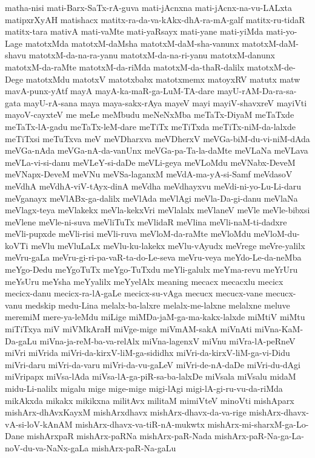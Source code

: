 {matha-nisi
mati-Barx-SaTx-rA-guva
mati-jAcnxna
mati-jAcnx-na-vu-LALxta
matipxrXyAH
matishacx
matitx-ra-da-va-kAkx-dhA-ra-mA-galf
matitx-ru-tidaR
matitx-tara
mativA
mati-vaMte
mati-yaRsayx
mati-yane
mati-yiMda
mati-yo-Lage
matotxMda
matotxM-daMsha
matotxM-daM-sha-vanunx
matotxM-daM-shavu
matotxM-da-na-ra-yanu
matotxM-da-na-ri-yanu
matotxM-danunx
matotxM-da-raMte
matotxM-da-riMda
matotxM-da-thaR-dalilx
matotxM-de-Dege
matotxMdu
matotxV
matotxbabx
matotxmemx
matoyxRV
matutx
matw
mavA-punx-yAtf
mayA
mayA-ka-maR-ga-LuM-TA-dare
mayU-rAM-Da-ra-sa-gata
mayU-rA-sana
maya
maya-sakx-rAya
mayeV
mayi
mayiV-shavxreV
mayiVti
mayoV-cayxteV
me
meLe
meMbudu
meNeNxMba
meTaTx-DiyaM
meTaTxde
meTaTx-lA-gadu
meTaTx-leM-dare
meTiTx
meTiTxda
meTiTx-niM-da-lalxde
meTiTxsi
meTuTxva
meV
meVDharxva
meVDherxV
meVGa-biM-du-vi-niM-dAda
meVGa-nAda
meVGa-nA-da-vanUnx
meVGa-pa-Ta-la-daMte
meVLaNa
meVLava
meVLa-vi-si-danu
meVLeY-si-daDe
meVLi-geya
meVLoMdu
meVNabx-DeveM
meVNapx-DeveM
meVNu
meVSa-laganxM
meVdA-ma-yA-si-Samf
meVdasoV
meVdhA
meVdhA-viV-tAyx-dinA
meVdha
meVdhayxvu
meVdi-ni-yo-Lu-Li-daru
meVganayx
meVlABx-ga-dalilx
meVlAda
meVlAgi
meVla-Da-gi-danu
meVlaNa
meVlagx-teya
meVlakekx
meVla-kekxVri
meVlalalx
meVlaneV
meVle
meVle-bibxsi
meVlene
meVle-ni-suva
meVliTuTx
meVlidaR
meVlina
meVli-naM-ti-dadxre
meVli-pupxde
meVli-risi
meVli-ruva
meVloM-da-raMte
meVloMdu
meVloM-du-koVTi
meVlu
meVluLaLx
meVlu-ku-lakekx
meVlu-vAyudx
meVrege
meVre-yalilx
meVru-gaLa
meVru-gi-ri-pa-vaR-ta-do-Le-seva
meVru-veya
meYdo-Le-da-neMba
meYgo-Dedu
meYgoTuTx
meYgo-TuTxdu
meYli-galulx
meYma-revu
meYrUru
meYsUru
meYsha
meYyalilx
meYyelAlx
meaning
mecacx
mecacxlu
mecicx
mecicx-danu
mecicx-ra-lA-gaLe
mecicx-su-vAga
mecucx
mecucx-vane
mecucx-vanu
medskip
medu-Lina
melalx-ba-lalxre
melalx-me-lalxne
melalxne
meluve
meremiM
mere-ya-leMdu
miLige
miMDa-jaM-ga-ma-kakx-lalxde
miMtiV
miMtu
miTiTxya
miV
miVMkAraH
miVge-mige
miVmAM-sakA
miVnAti
miVna-KaM-Da-gaLu
miVna-ja-reM-ba-va-relAlx
miVna-lagenxV
miVnu
miVra-lA-peRneV
miVri
miVrida
miVri-da-kirxV-liM-ga-sididhx
miVri-da-kirxV-liM-ga-vi-Didu
miVri-daru
miVri-da-varu
miVri-da-vu-gaLeV
miVri-de-nA-daDe
miVri-du-dAgi
miVripapx
miVsa-lAda
miVsa-lA-ga-piR-sa-ba-lalxDe
miVsala
miVsalu
midaM
midu-Li-nalilx
migalu
mige
mige-mige
migi-lAgi
migi-lA-gi-ru-vu-da-riMda
mikAkxda
mikakx
mikikxna
militAvx
militaM
mimiVteV
minoVti
mishAparx
mishArx-dhAvxKayxM
mishArxdhavx
mishArx-dhavx-da-va-rige
mishArx-dhavx-vA-si-loV-kAnAM
mishArx-dhavx-va-tiR-nA-mukwtx
mishArx-mi-sharxM-ga-Lo-Dane
mishArxpaR
mishArx-paRNa
mishArx-paR-Nada
mishArx-paR-Na-ga-La-noV-du-va-NaNx-gaLa
mishArx-paR-Na-gaLu
}
